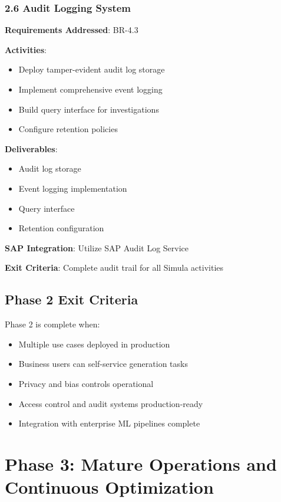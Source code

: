 \documentclass[12pt,a4paper,twoside]{report}
\begin{document}
\subsubsection{2.6 Audit Logging System}

\begin{tcolorbox}[colback=green!5,colframe=green!70,title=2.6 Audit Trail]
\textbf{Requirements Addressed}: BR-4.3

\textbf{Activities}:
\begin{itemize}
\item Deploy tamper-evident audit log storage
\item Implement comprehensive event logging
\item Build query interface for investigations
\item Configure retention policies
\end{itemize}

\textbf{Deliverables}:
\begin{itemize}
\item Audit log storage
\item Event logging implementation
\item Query interface
\item Retention configuration
\end{itemize}

\textbf{SAP Integration}: Utilize SAP Audit Log Service

\textbf{Exit Criteria}: Complete audit trail for all Simula activities
\end{tcolorbox}

\subsection{Phase 2 Exit Criteria}

Phase 2 is complete when:
\begin{itemize}
\item[\checkmark] Multiple use cases deployed in production
\item[\checkmark] Business users can self-service generation tasks
\item[\checkmark] Privacy and bias controls operational
\item[\checkmark] Access control and audit systems production-ready
\item[\checkmark] Integration with enterprise ML pipelines complete
\end{itemize}


\section{Phase 3: Mature Operations and Continuous Optimization}
\end{document}
